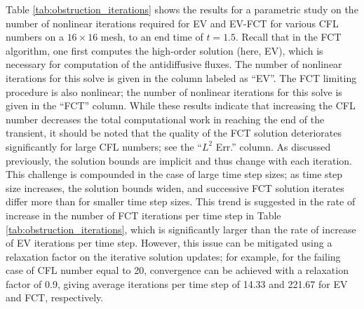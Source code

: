 Table \ref{tab:obstruction_iterations} shows the results for a parametric study
on the number of nonlinear iterations required for EV and EV-FCT for various
CFL numbers on a $16\times 16$ mesh, to an end time of $t=1.5$. Recall that in the FCT algorithm, one first computes the high-order solution
(here, EV), which is necessary for computation of the antidiffusive fluxes.
The number of nonlinear iterations for this solve is given in the column
labeled as ``EV''. The FCT limiting procedure is also nonlinear; the number
of nonlinear iterations for this solve is given in the ``FCT'' column.
While these results indicate that increasing the CFL number decreases the total
computational work in reaching the end of the transient, it should be noted that
the quality of the FCT solution deteriorates significantly for large CFL numbers;
see the ``$L^2$ Err.'' column.
As discussed previously, the solution bounds are implicit and thus change
with each iteration. This challenge is compounded in the case of large time
step sizes; as time step size increases, the solution bounds widen, and
successive FCT solution iterates differ more than for smaller time step sizes.
This trend is suggested in the rate of increase in the number of FCT iterations per time step
in Table \ref{tab:obstruction_iterations}, which is significantly larger than the
rate of increase of EV iterations per time step. However, this issue can be mitigated
using a relaxation factor on the iterative solution updates; for example, for
the failing case of CFL number equal to 20, convergence can be achieved with a
relaxation factor of 0.9, giving average iterations per time step of
14.33 and 221.67 for EV and FCT, respectively.

